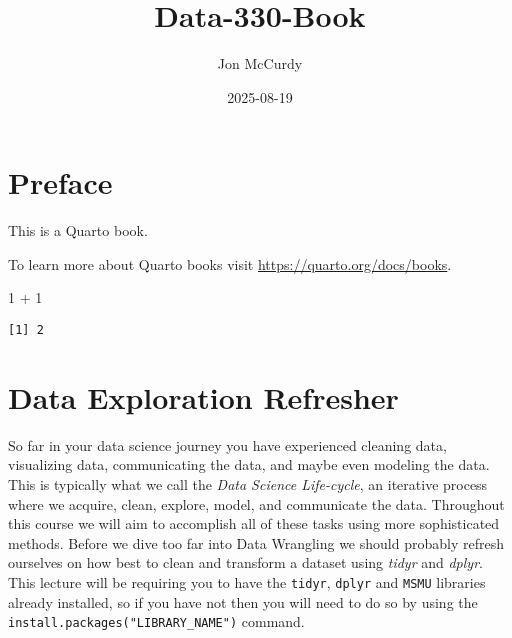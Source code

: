 \documentclass[
  letterpaper,
  DIV=11,
  numbers=noendperiod]{scrreprt}
\title{Data-330-Book}
\author{Jon McCurdy}
\date{2025-08-19}
\newenvironment{Shaded}{\begin{snugshade}}{\end{snugshade}}
\newcommand{\DecValTok}[1]{\textcolor[rgb]{0.68,0.00,0.00}{#1}}
\newcommand{\SpecialCharTok}[1]{\textcolor[rgb]{0.37,0.37,0.37}{#1}}
\renewcommand*\contentsname{Table of contents}
\newcommand\contentsname{Table of contents}
\begin{document}
\maketitle

\renewcommand*\contentsname{Table of contents}
{
\hypersetup{linkcolor=}
\setcounter{tocdepth}{2}
\tableofcontents
}


\chapter*{Preface}\label{preface}


This is a Quarto book.

To learn more about Quarto books visit
\url{https://quarto.org/docs/books}.

\begin{Shaded}
\begin{Highlighting}[]
\DecValTok{1} \SpecialCharTok{+} \DecValTok{1}
\end{Highlighting}
\end{Shaded}

\begin{verbatim}
[1] 2
\end{verbatim}


\chapter{Data Exploration Refresher}\label{data-exploration-refresher}

So far in your data science journey you have experienced cleaning data,
visualizing data, communicating the data, and maybe even modeling the
data. This is typically what we call the
\textit{Data Science Life-cycle}, an iterative process where we acquire,
clean, explore, model, and communicate the data. Throughout this course
we will aim to accomplish all of these tasks using more sophisticated
methods. Before we dive too far into Data Wrangling we should probably
refresh ourselves on how best to clean and transform a dataset using
\textit{tidyr} and \textit{dplyr}. This lecture will be requiring you to
have the \texttt{tidyr}, \texttt{dplyr} and \texttt{MSMU} libraries
already installed, so if you have not then you will need to do so by
using the \texttt{install.packages("LIBRARY\_NAME")} command.
\end{document}
